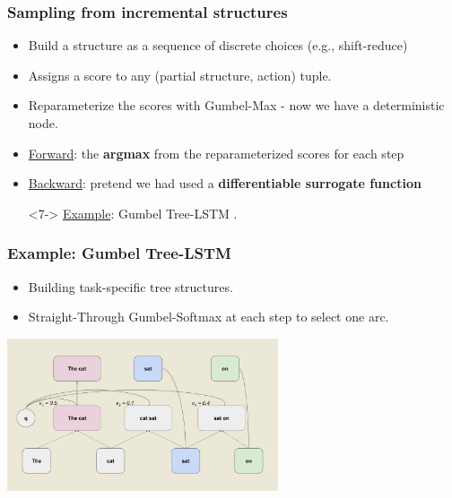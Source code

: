 

\begin{frame}%
\frametitle{Sampling from incremental structures}%
\centering
\begin{itemize}
    \item<2-> Build a structure as a sequence of discrete choices (e.g., shift-reduce)
    \item<3-> Assigns a score to any (partial structure, action) tuple.
    \item<4-> Reparameterize the scores with Gumbel-Max - now we have a deterministic node.
    \item<5-> \underline{Forward}: the \textbf{argmax} from the reparameterized scores for each step
    \item<6-> \underline{Backward}: pretend we had used a \textbf{differentiable surrogate function}
    \item[]<7-> \underline{Example}: Gumbel Tree-LSTM \citep{choi2017learning}.
\end{itemize}
\end{frame}


\begin{frame}%
\frametitle{Example: Gumbel Tree-LSTM}%
\centering
\small
\begin{itemize}
\item Building task-specific tree structures.
\item Straight-Through Gumbel-Softmax at each step to select one arc.
\end{itemize}
\begin{center}
\includegraphics[width=0.6\textwidth]{img/300_gumbel_tree_lstm.pdf}%
\end{center}
\end{frame}



